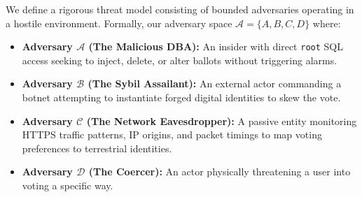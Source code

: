 \documentclass[journal,10pt,twocolumn]{IEEEtran}
\begin{document}
We define a rigorous threat model consisting of bounded adversaries operating in a hostile environment. Formally, our adversary space $\mathcal{A} = \{A, B, C, D\}$ where:

\begin{itemize}
    \item \textbf{Adversary $\mathcal{A}$ (The Malicious DBA):} An insider with direct \texttt{root} SQL access seeking to inject, delete, or alter ballots without triggering alarms.
    \item \textbf{Adversary $\mathcal{B}$ (The Sybil Assailant):} An external actor commanding a botnet attempting to instantiate forged digital identities to skew the vote.
    \item \textbf{Adversary $\mathcal{C}$ (The Network Eavesdropper):} A passive entity monitoring HTTPS traffic patterns, IP origins, and packet timings to map voting preferences to terrestrial identities.
    \item \textbf{Adversary $\mathcal{D}$ (The Coercer):} An actor physically threatening a user into voting a specific way.
\end{itemize}
\end{document}
